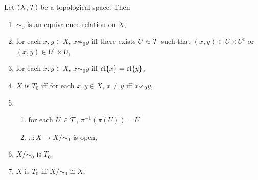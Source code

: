 \documentclass{book}
\begin{document}
	\begin{ex}
		Let $(X, \mathcal{T})$ be a topological space. Then
		\begin{enumerate}
			\item $\sim_0$ is an equivalence relation on $X$,
			\item for each $x,y \in X$, $x \not \sim_0 y$ iff there exists $U \in \mathcal{T}$ such that $(x,y) \in U \times U^c$ or $(x,y) \in U^c \times U$,
			\item for each $x,y \in X$, $x \sim_0 y$ iff $\operatorname{cl} \{x\} = \operatorname{cl} \{y\}$,
			\item $X$ is $T_0$ iff for each $x,y \in X$, $x \neq y$ iff $x \not \sim_0 y$,
			\item 
			\begin{enumerate}
				\item for each $U \in \mathcal{T}$, $\pi^{-1}(\pi(U)) = U$ 
				\item $\pi: X \rightarrow X / \sim_0$ is open,
			\end{enumerate}
			\item $X/ \sim_0$ is $T_0$,
			\item $X$ is $T_0$ iff $X/\sim_0 \cong X$.
		\end{enumerate}
	\end{ex}
\end{document}
